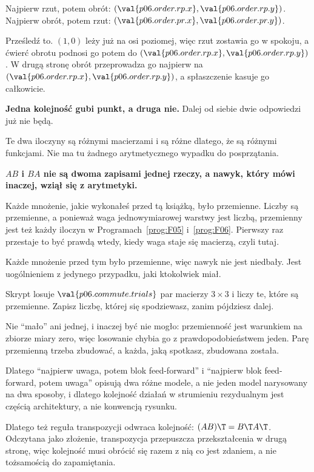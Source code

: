 \begin{fr}
\begin{ansblock}
Najpierw rzut, potem obrót: $(\val{p06.order.rp.x}, \val{p06.order.rp.y})$.
Najpierw obrót, potem rzut: $(\val{p06.order.pr.x}, \val{p06.order.pr.y})$.
\end{ansblock}

Prześledź to. $(1, 0)$ leży już na osi poziomej, więc rzut zostawia go w
spokoju, a ćwierć obrotu podnosi go potem do
$(\val{p06.order.rp.x}, \val{p06.order.rp.y})$. W drugą stronę obrót
przeprowadza go najpierw na $(\val{p06.order.rp.x}, \val{p06.order.rp.y})$, a
spłaszczenie kasuje go całkowicie.

\textbf{Jedna kolejność gubi punkt, a druga nie.} Dalej od siebie dwie
odpowiedzi już nie będą.
\end{fr}

\begin{fr}

Te dwa iloczyny są różnymi macierzami i są różne dlatego, że są różnymi
funkcjami. Nie ma tu żadnego arytmetycznego wypadku do posprzątania.

\begin{trapbox}
\textbf{$AB$ i $BA$ nie są dwoma zapisami jednej rzeczy, a nawyk, który mówi
inaczej, wziął się z arytmetyki.}

Każde mnożenie, jakie wykonałeś przed tą książką, było przemienne. Liczby są
przemienne, a ponieważ waga jednowymiarowej warstwy jest liczbą, przemienny
jest też każdy iloczyn w Programach~\ref{prog:F05} i~\ref{prog:F06}. Pierwszy
raz przestaje to być prawdą wtedy, kiedy waga staje się macierzą, czyli tutaj.

Każde mnożenie przed tym było przemienne, więc nawyk nie jest niedbały. Jest
uogólnieniem z jedynego przypadku, jaki ktokolwiek miał.
\end{trapbox}

Skrypt losuje $\val{p06.commute.trials}$ par macierzy $3 \times 3$ i liczy te,
które są przemienne. Zapisz liczbę, której się spodziewasz, zanim pójdziesz
dalej.
\dotline
\nextframe
\end{fr}

\begin{fr}
Nie \enquote{mało} \dash{} ani jednej, i inaczej być nie mogło: przemienność
jest warunkiem na zbiorze miary zero, więc losowanie chybia go z
prawdopodobieństwem jeden. Parę przemienną trzeba zbudować, a każda, jaką
spotkasz, zbudowana została.

\begin{aibox}
Dlatego \enquote{najpierw uwaga, potem blok feed-forward} i
\enquote{najpierw blok feed-forward, potem uwaga} opisują dwa różne modele, a
nie jeden model narysowany na dwa sposoby, i dlatego kolejność działań w
strumieniu rezydualnym jest częścią architektury, a nie konwencją rysunku.

Dlatego też reguła transpozycji odwraca kolejność: $(AB)\T = B\T A\T$.
Odczytana jako złożenie, transpozycja przepuszcza przekształcenia w drugą
stronę, więc kolejność musi obrócić się razem z nią \dash{} co jest zdaniem, a
nie tożsamością do zapamiętania.
\end{aibox}
\end{fr}

